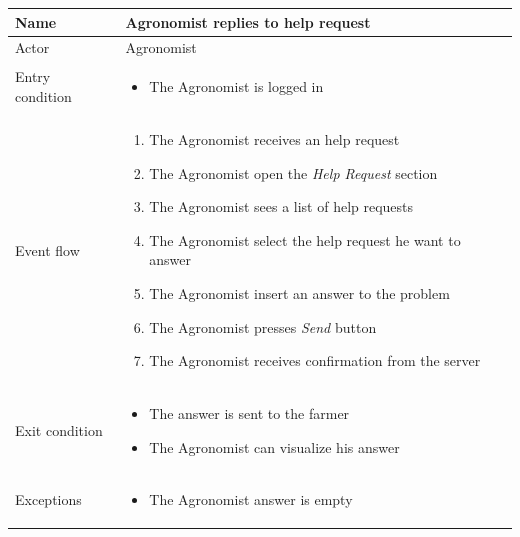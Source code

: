 \begin{table}[H]
    \begin{tabu} to \textwidth {|X|X[4]|}
        \hline
        Name            & Agronomist replies to help request \\ \hline
        Actor           & Agronomist                     \\ \hline
        Entry condition & \begin{itemize}
            \item The Agronomist is logged in
        \end{itemize} \\ \hline
        Event flow      & \begin{enumerate}
            \item The Agronomist receives an help request
            \item The Agronomist open the \emph{Help Request} section
            \item The Agronomist sees a list of help requests
            \item The Agronomist select the help request he want to answer
            \item The Agronomist insert an answer to the problem
            \item The Agronomist presses \emph{Send} button
            \item The Agronomist receives confirmation from the server
        \end{enumerate} \\ \hline
        Exit condition  & \begin{itemize}
            \item The answer is sent to the farmer
            \item The Agronomist can visualize his answer
        \end{itemize} \\ \hline
        Exceptions      & \begin{itemize}
            \item The Agronomist answer is empty
        \end{itemize} \\ \hline
    \end{tabu}
\end{table}

\newpage
